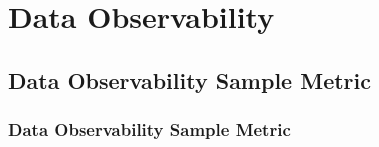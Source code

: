 \chapter{Data Observability}


\clearpage
\thispagestyle{observabilitystyle}
\section{Data Observability Sample Metric}
\subsection{Data Observability Sample Metric}